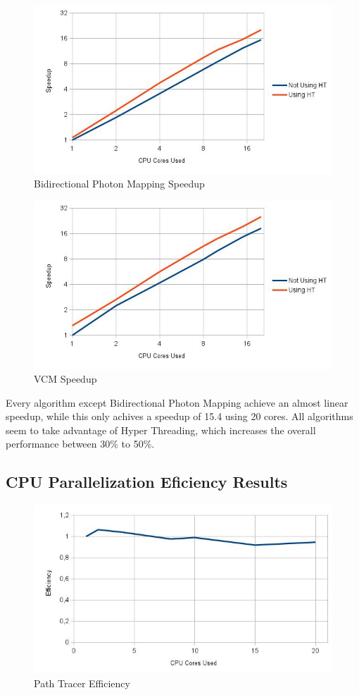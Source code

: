 \begin{figure}[H]
\centering
\includegraphics[width=0.8\linewidth]{img/bpmSpeedup.jpg}
\caption{\label{img:bpmSpeedup} Bidirectional Photon Mapping Speedup}
\end{figure}

\begin{figure}[H]
\centering
\includegraphics[width=0.8\linewidth]{img/vcmSpeedup.jpg}
\caption{\label{img:vcmSpeedup} VCM Speedup}
\end{figure}

Every algorithm except Bidirectional Photon Mapping achieve an almost linear speedup, while this only achives a speedup of 15.4 using 20 cores. All algorithms seem to take advantage of Hyper Threading, which increases the overall performance between 30\% to 50\%.

\subsection{CPU Parallelization Eficiency Results}

\begin{figure}[H]
\centering
\includegraphics[width=0.8\linewidth]{img/ptEff.jpg}
\caption{\label{img:ptEff} Path Tracer Efficiency}
\end{figure}

